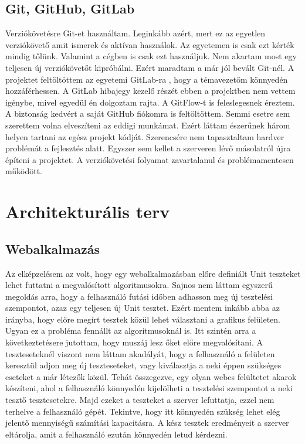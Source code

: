 \documentclass[12pt]{report} %
\begin{document}
\section{Git, GitHub, GitLab} %

Verziókövetésre Git-et \cite{git} használtam. Leginkább azért, mert ez az egyetlen verziókövető amit ismerek és aktívan használok. Az egyetemen is csak ezt kérték mindig tőlünk. Valamint a cégben is csak ezt használjuk. Nem akartam most egy teljesen új verziókövetőt kipróbálni. Ezért maradtam a már jól bevált Git-nél. A projektet feltöltöttem az egyetemi GitLab-ra \cite{gitLab}, hogy a témavezetőm könnyedén hozzáférhessen. A GitLab hibajegy kezelő részét ebben a projektben nem vettem igénybe, mivel egyedül én dolgoztam rajta. A GitFlow-t is feleslegesnek éreztem. A biztonság kedvért a saját GitHub \cite{gitHub} fiókomra is feltöltöttem. Semmi esetre sem szerettem volna elveszíteni az eddigi munkámat. Ezért láttam észerűnek három helyen tartani az egész projekt kódját. Szerencsére nem tapasztaltam hardver problémát a fejlesztés alatt. Egyszer sem kellet a szerveren lévő másolatról újra építeni a projektet. A verziókövetési folyamat zavartalanul és problémamentesen működött.

\chapter{Architekturális terv} %

\section{Webalkalmazás} %

Az elképzelésem az volt, hogy egy webalkalmazásban előre definiált Unit teszteket lehet futtatni a megvalósított algoritmusokra. Sajnos nem láttam egyszerű megoldás arra, hogy a felhasználó futási időben adhasson meg új tesztelési szempontot, azaz egy teljesen új Unit tesztet. Ezért mentem inkább abba az irányba, hogy előre megírt tesztek közül lehet választani a grafikus felületen. Ugyan ez a probléma fennállt az algoritmusoknál is. Itt szintén arra a következtetésere jutottam, hogy muszáj lesz őket előre megvalósítani. A teszteseteknél viszont nem láttam akadályát, hogy a felhasználó a felületen keresztül adjon meg új teszteseteket, vagy kiválasztja a neki éppen szükséges eseteket a már létezők közül. Tehát összegezve, egy olyan webes felültetet akarok készíteni, ahol a felhasználó könnyedén kijelölheti a tesztelési szempontot a neki tesztő tesztesetekre. Majd ezeket a teszteket a szerver lefuttatja, ezzel nem terhelve a felhasználó gépét. Tekintve, hogy itt könnyedén szükség lehet elég jelentő mennyiségű számítási kapacitásra. A kész tesztek eredményeit a szerver eltárolja, amit a felhasználó ezután könnyedén letud kérdezni.
\end{document}
